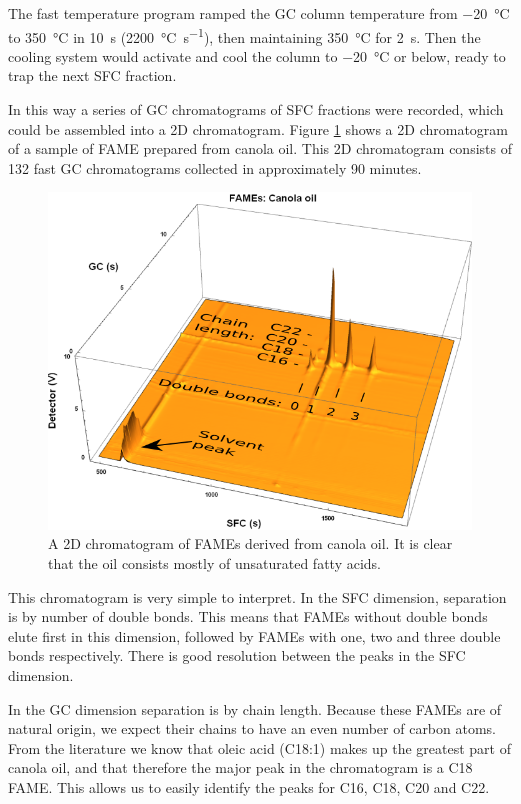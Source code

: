 The fast temperature program ramped the GC column temperature from
\SI{-20}{\celsius} to \SI{350}{\celsius} in \SI{10}{s}
(\SI{2200}{\celsius\per\second}), then maintaining \SI{350}{\celsius} for
\SI{2}{\second}. Then the cooling system would activate and cool the column to
\SI{-20}{\celsius} or below, ready to trap the next SFC fraction.

In this way a series of GC chromatograms of SFC fractions were recorded, which
could be assembled into a 2D chromatogram. Figure \ref{fig:2DCanola} shows
a 2D chromatogram of a sample of FAME prepared from canola oil. This 2D
chromatogram consists of 132 fast GC chromatograms collected in approximately 90
minutes.


\begin{figure}
\centering
\includegraphics[width=\textwidth]{Figures/Interpretation.png}
\decoRule

\caption[SFC×GC of canola oil]{A 2D chromatogram of FAMEs derived from
canola oil. It is clear that the oil consists mostly of unsaturated fatty
acids.}

\label{fig:2DCanola}
\end{figure}

This chromatogram is very simple to interpret. In the SFC dimension, separation
is by number of double bonds. This means that FAMEs without double bonds elute
first in this dimension, followed by FAMEs with one, two and three double bonds
respectively. There is good resolution between the peaks in the SFC dimension. 

In the GC dimension separation is by chain length. Because these FAMEs are of
natural origin, we expect their chains to have an even number of carbon atoms.
From the literature  we know that oleic acid (C18:1) makes up
the greatest part of canola oil, and that therefore the major peak in the
chromatogram is a C18 FAME. This allows us to easily identify the peaks for C16,
C18, C20 and C22. 

